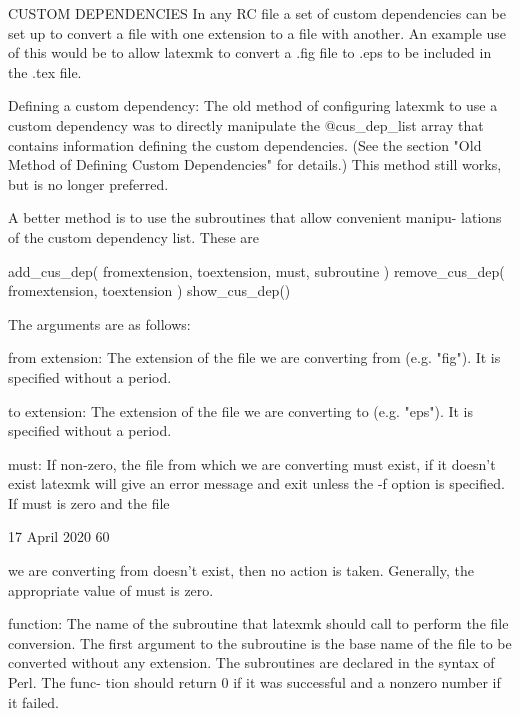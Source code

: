 CUSTOM DEPENDENCIES
       In any RC file a set of custom dependencies can be set up to convert  a
       file with one extension to a file with another.  An example use of this
       would be to allow latexmk to convert a .fig file to .eps to be included
       in the .tex file.


   Defining a custom dependency:
       The old method of configuring latexmk to use a custom dependency was to
       directly manipulate the @cus_dep_list array that  contains  information
       defining  the  custom  dependencies.   (See  the section "Old Method of
       Defining Custom Dependencies" for details.) This  method  still  works,
       but is no longer preferred.

       A better method is to use the subroutines that allow convenient manipu-
       lations of the custom dependency list.  These are

           add_cus_dep( fromextension, toextension, must, subroutine )
           remove_cus_dep( fromextension, toextension )
           show_cus_dep()

       The arguments are as follows:

       from extension:
              The extension of the file we are converting from  (e.g.  "fig").
              It is specified without a period.

       to extension:
              The extension of the file we are converting to (e.g. "eps").  It
              is specified without a period.

       must:  If non-zero, the file from which we are converting  must  exist,
              if  it doesn't exist latexmk will give an error message and exit
              unless the -f option is specified.  If must is zero and the file



                                 17 April 2020                              60








              we  are  converting from doesn't exist, then no action is taken.
              Generally, the appropriate value of must is zero.

       function:
              The name of the subroutine that latexmk should call  to  perform
              the  file  conversion.   The first argument to the subroutine is
              the base name of the file to be converted without any extension.
              The  subroutines  are declared in the syntax of Perl.  The func-
              tion should return 0 if it was successful and a  nonzero  number
              if it failed.


